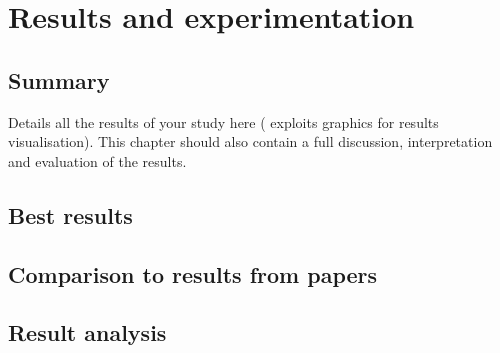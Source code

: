
\chapter{Results and experimentation}
\label{chap:results}
\ifpdf
    \graphicspath{{Algorithms/Figures/PNG/}{EvaluationTask/Figures/PDF/}{Algorithms/Figures/}}
\else
    \graphicspath{{Algorithms/Figures/EPS/}{EvaluationTask/Figures/}}
\fi


\section*{Summary}
Details all the results of your study here ( exploits graphics for results visualisation). 
This chapter should also contain a full discussion, interpretation and evaluation of the results. 



\section{Best results} 
\label{sec:bestres}
\section{Comparison to results from papers} 
\label{sec:rescomparison}
\section{Result analysis} 
\label{sec:resanalysis}


